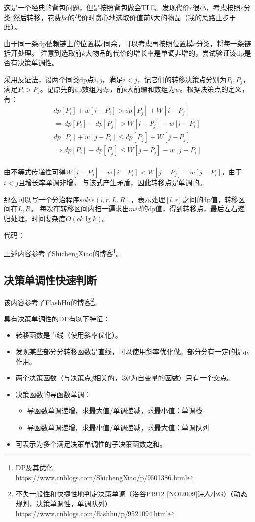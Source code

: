 这是一个经典的背包问题，但是按照背包做会TLE。发现代价$c$很小，考虑按照$c$分类
然后转移，花费$kc$的代价时贪心地选取价值前$k$大的物品（我的思路止步于此）。

由于同一条dp依赖链上的位置模$c$同余，可以考虑再按照位置模$c$分类，将每一条链拆开处理。
注意到选取前$k$大物品的代价的增长率是单调非增的，尝试验证该dp是否有决策单调性。

采用反证法，设两个同类dp点$i,j$，满足$i<j$，记它们的转移决策点分别为$P_i,P_j$，
满足$P_i>P_j$。记原先的dp数组为$dp$，前$k$大前缀和数组为$w$。根据决策点的定义，有：
\begin{eqnarray*}
    dp[P_i]+w[i-P_i]>dp[P_j]+W[i-P_j]\\
    \Rightarrow dp[P_i]-dp[P_j]>W[i-P_j]-w[i-P_i]\\
    dp[P_i]+w[j-P_i]\leq dp[P_j]+W[j-P_j]\\
    \Rightarrow dp[P_i]-dp[P_j]\leq W[j-P_j]-w[j-P_i]\\
\end{eqnarray*}

由不等式传递性可得$W[i-P_j]-w[i-P_i]<W[j-P_j]-w[j-P_i]$，由于$i<j$且增长率单调非增，
与该式产生矛盾，因此转移点是单调的。

那么可以写一个分治程序$solve(l,r,L,R)$，表示处理$[l,r]$之间的dp值，转移区间在$L,R$。
每次在转移区间内扫一遍求出$mid$的dp值，得到转移点，最后左右递归处理，时间复杂度$O(ck\lg k)$。

代码：


上述内容参考了ShichengXiao的博客\footnote{
    DP及其优化\\
    \url{https://www.cnblogs.com/ShichengXiao/p/9501386.html}
}。
\subsection{决策单调性快速判断}
该内容参考了FlashHu的博客\footnote{
    不失一般性和快捷性地判定决策单调（洛谷P1912 [NOI2009]诗人小G）（动态规划，决策单调性，单调队列）\\
    \url{https://www.cnblogs.com/flashhu/p/9521094.html}
}。

具有决策单调性的DP有以下特征：

\begin{itemize}
    \item 转移函数是直线（使用斜率优化）。
    \item 发现某些部分分转移函数是直线，可以使用斜率优化做。部分分有一定的提示作用。
    \item 两个决策函数（与决策点$j$相关的，以$i$为自变量的函数）只有一个交点。
    \item 决策函数的导函数单调：
    \begin{itemize}
        \item 导函数单调递增，求最大值/单调递减，求最小值：单调栈
        \item 导函数单调递增，求最小值/单调递减，求最大值：单调队列
    \end{itemize}
    \item 可表示为多个满足决策单调性的子决策函数之和。
\end{itemize}

